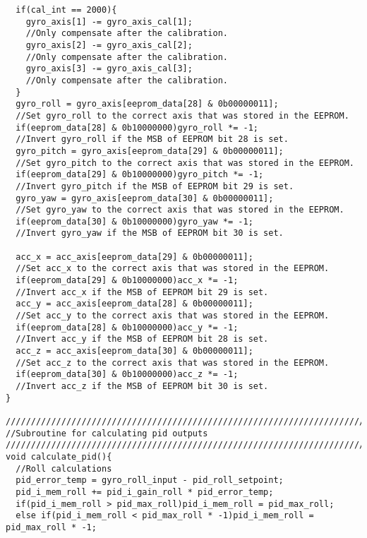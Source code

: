 \begin{lstlisting}
  if(cal_int == 2000){
    gyro_axis[1] -= gyro_axis_cal[1];                                       
    //Only compensate after the calibration.
    gyro_axis[2] -= gyro_axis_cal[2];                                       
    //Only compensate after the calibration.
    gyro_axis[3] -= gyro_axis_cal[3];                                       
    //Only compensate after the calibration.
  }
  gyro_roll = gyro_axis[eeprom_data[28] & 0b00000011];                      
  //Set gyro_roll to the correct axis that was stored in the EEPROM.
  if(eeprom_data[28] & 0b10000000)gyro_roll *= -1;                          
  //Invert gyro_roll if the MSB of EEPROM bit 28 is set.
  gyro_pitch = gyro_axis[eeprom_data[29] & 0b00000011];                     
  //Set gyro_pitch to the correct axis that was stored in the EEPROM.
  if(eeprom_data[29] & 0b10000000)gyro_pitch *= -1;                         
  //Invert gyro_pitch if the MSB of EEPROM bit 29 is set.
  gyro_yaw = gyro_axis[eeprom_data[30] & 0b00000011];                       
  //Set gyro_yaw to the correct axis that was stored in the EEPROM.
  if(eeprom_data[30] & 0b10000000)gyro_yaw *= -1;                           
  //Invert gyro_yaw if the MSB of EEPROM bit 30 is set.

  acc_x = acc_axis[eeprom_data[29] & 0b00000011];                           
  //Set acc_x to the correct axis that was stored in the EEPROM.
  if(eeprom_data[29] & 0b10000000)acc_x *= -1;                              
  //Invert acc_x if the MSB of EEPROM bit 29 is set.
  acc_y = acc_axis[eeprom_data[28] & 0b00000011];                           
  //Set acc_y to the correct axis that was stored in the EEPROM.
  if(eeprom_data[28] & 0b10000000)acc_y *= -1;                              
  //Invert acc_y if the MSB of EEPROM bit 28 is set.
  acc_z = acc_axis[eeprom_data[30] & 0b00000011];                           
  //Set acc_z to the correct axis that was stored in the EEPROM.
  if(eeprom_data[30] & 0b10000000)acc_z *= -1;                              
  //Invert acc_z if the MSB of EEPROM bit 30 is set.
}

////////////////////////////////////////////////////////////////////////////////////////  
//Subroutine for calculating pid outputs
////////////////////////////////////////////////////////////////////////////////////////  
void calculate_pid(){
  //Roll calculations
  pid_error_temp = gyro_roll_input - pid_roll_setpoint;
  pid_i_mem_roll += pid_i_gain_roll * pid_error_temp;
  if(pid_i_mem_roll > pid_max_roll)pid_i_mem_roll = pid_max_roll;
  else if(pid_i_mem_roll < pid_max_roll * -1)pid_i_mem_roll = pid_max_roll * -1;


\end{lstlisting}
